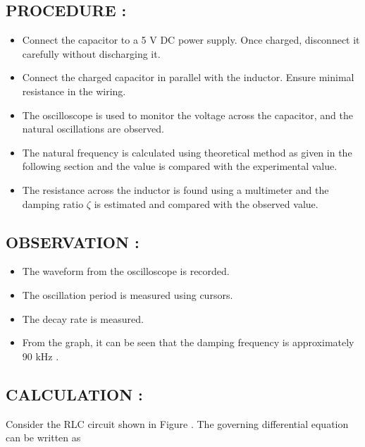 \documentclass[12pt]{article}
\begin{document}
\subsection{\textbf{PROCEDURE : }}
\begin{itemize}
\item Connect the capacitor to a 5 V DC power supply. Once charged, disconnect it carefully without discharging it.
\item Connect the charged capacitor in parallel with the inductor. Ensure minimal resistance in the wiring.
\item The oscilloscope is used to monitor the voltage across the capacitor, and the natural oscillations are observed.
\item The natural frequency is calculated using theoretical method as given in the following section and the value is compared with the experimental value. 
\item The resistance across the inductor is found using a multimeter and the damping ratio $\zeta$ is estimated and compared with the observed value.
\end{itemize}

\subsection{\textbf{OBSERVATION : }}
\begin{itemize}
\item The waveform from the oscilloscope is recorded.
\item The oscillation period is measured using cursors.
\item The decay rate is measured.
\item From the graph, it can be seen that the damping frequency is approximately 90 kHz .
\end{itemize}

\subsection{\textbf{CALCULATION : }}
Consider the RLC circuit shown in Figure . The governing differential equation can be written as \\
\end{document}
